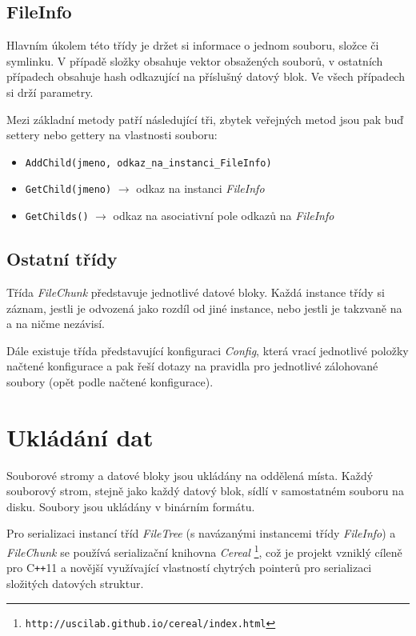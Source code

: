\subsection{FileInfo}

Hlavním úkolem této třídy je držet si informace o jednom souboru, složce či
symlinku. V případě složky obsahuje vektor obsažených souborů, v ostatních
případech obsahuje hash odkazující na příslušný datový blok. Ve všech případech
si drží parametry.

Mezi základní metody patří následující tři, zbytek veřejných metod jsou pak buď
settery nebo gettery na vlastnosti souboru:

\begin{itemize}
	\item\texttt{AddChild(jmeno, odkaz\_na\_instanci\_FileInfo)}
	\item\texttt{GetChild(jmeno)} $\rightarrow$ odkaz na instanci {\it FileInfo}
	\item\texttt{GetChilds()} $\rightarrow$ odkaz na asociativní pole odkazů
	na {\it FileInfo}
\end{itemize}

\subsection{Ostatní třídy}

Třída {\it FileChunk} představuje jednotlivé datové bloky. Každá instance třídy
si záznam, jestli je odvozená jako rozdíl od jiné instance, nebo jestli je
takzvaně na  a na ničme nezávisí.

Dále existuje třída představující konfiguraci {\it Config}, která vrací
jednotlivé položky načtené konfigurace a pak řeší dotazy na pravidla pro
jednotlivé zálohované soubory (opět podle načtené konfigurace).

\section{Ukládání dat}

Souborové stromy a datové bloky jsou ukládány na oddělená místa. Každý souborový
strom, stejně jako každý datový blok, sídlí v samostatném souboru na disku.
Soubory jsou ukládány v binárním formátu.

Pro serializaci instancí tříd {\it FileTree} (s navázanými instancemi třídy
{\it FileInfo}) a {\it FileChunk} se používá serializační knihovna {\it Cereal}%
\footnote{\texttt{http://uscilab.github.io/cereal/index.html}}, což je projekt
vzniklý cíleně pro C{\tt ++}11 a novější využívající vlastností chytrých
pointerů pro serializaci složitých datových struktur.

